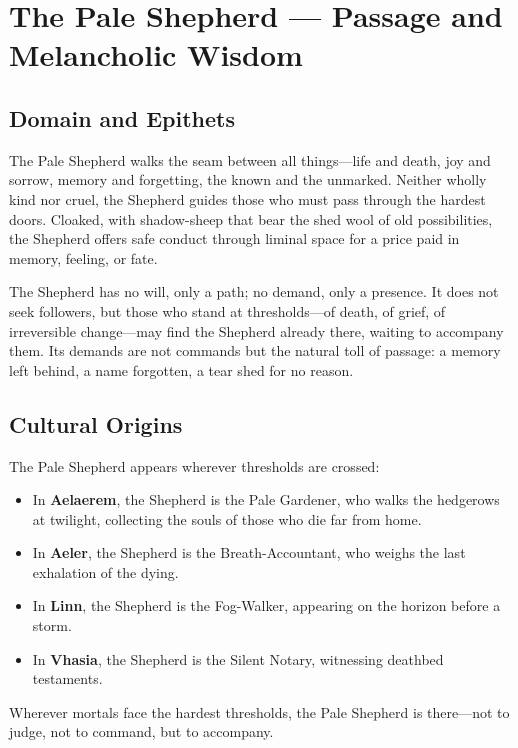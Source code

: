 \section{The Pale Shepherd — Passage and Melancholic Wisdom}

\subsection{Domain and Epithets}

The Pale Shepherd walks the seam between all things—life and death, joy and sorrow, memory and forgetting, the known and the unmarked. Neither wholly kind nor cruel, the Shepherd guides those who must pass through the hardest doors. Cloaked, with shadow-sheep that bear the shed wool of old possibilities, the Shepherd offers safe conduct through liminal space for a price paid in memory, feeling, or fate.

The Shepherd has no will, only a path; no demand, only a presence. It does not seek followers, but those who stand at thresholds—of death, of grief, of irreversible change—may find the Shepherd already there, waiting to accompany them. Its demands are not commands but the natural toll of passage: a memory left behind, a name forgotten, a tear shed for no reason.

\subsection{Cultural Origins}

The Pale Shepherd appears wherever thresholds are crossed:

\begin{itemize}
\item In \textbf{Aelaerem}, the Shepherd is the Pale Gardener, who walks the hedgerows at twilight, collecting the souls of those who die far from home.
\item In \textbf{Aeler}, the Shepherd is the Breath-Accountant, who weighs the last exhalation of the dying.
\item In \textbf{Linn}, the Shepherd is the Fog-Walker, appearing on the horizon before a storm.
\item In \textbf{Vhasia}, the Shepherd is the Silent Notary, witnessing deathbed testaments.
\end{itemize}

Wherever mortals face the hardest thresholds, the Pale Shepherd is there—not to judge, not to command, but to accompany.

